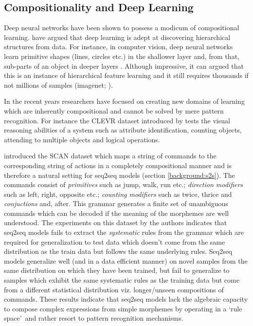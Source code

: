 
\subsection{Compositionality and Deep Learning}
Deep neural networks have been shown to possess a modicum of compositional learning. \cite{LeCun2015} have argued that deep learning is adept at discovering hierarchical structures from data. For instance, in computer vision, deep neural networks learn primitive shapes (lines, circles etc.) in the shallower layer and, from that, sub-parts of an object in deeper layers \citep{Zeiler2014}. Although impressive, it can argued that this is an instance of hierarchical feature learning and it still requires thousands if not millions of samples (imagenet; \citep{Deng2009}).

In the recent years researchers have focused on creating new domains of learning which are inherently compositional and cannot be solved by mere pattern recognition. For instance the CLEVR dataset introduced by \cite{Johnson2017} tests the visual reasoning abilities of a system such as attribute identification, counting objects, attending to multiple objects and logical operations. 


\cite{Lake2017} introduced the SCAN dataset which maps a string of commands to the corresponding string of actions in a completely compositional manner and is therefore a natural setting for seq2seq models (section \ref{background:s2s}). The commands consist of \textit{primitives} such as jump, walk, run etc.; \textit{direction modifiers} such as left, right, opposite etc.; \textit{counting modifiers} such as twice, thrice and \textit{conjuctions} and, after. This grammar generates a finite set of unambiguous commands which can be decoded if the meaning of the morphemes are well understood. The experiments on this dataset by the authors indicates that seq2seq models fails to extract the \textit{systematic} rules from the grammar which are required for generalization to test data which doesn't come from the same distribution as the train data but follows the same underlying rules. Seq2seq models generalize well (and in a data efficient manner) on novel samples from the same distribution on which they have been trained, but fail to generalize to samples which exhibit the same systematic rules as the training data but come from a different statistical distribution viz. longer/unseen compositions of commands. These results indicate that seq2seq models lack the algebraic capacity to compose complex expressions from simple morphemes by operating in a \lq rule space{}\rq\ and rather resort to pattern recognition mechanisms.

